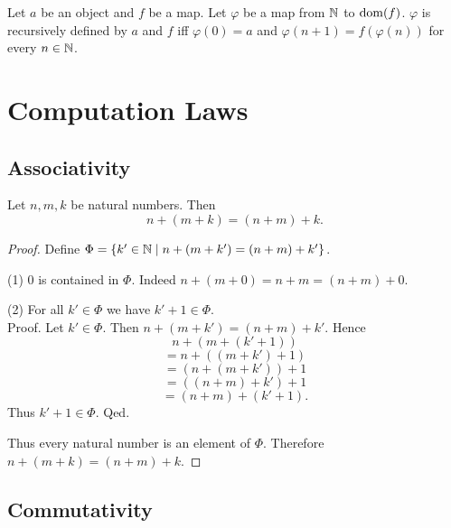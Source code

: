 \documentclass[10pt]{article}
\begin{document}
  \begin{forthel}
    \begin{proposition}
      Let $a$ be an object and $f$ be a map.
      Let $\varphi$ be a map from $\mathbb{N}$ to $\operatorname{dom}(f)$.
      $\varphi$ is recursively defined by $a$ and $f$ iff $\varphi(0) = a$ and
      $\varphi(n + 1) = f(\varphi(n))$ for every $n \in \mathbb{N}$.
    \end{proposition}
  \end{forthel}


  \section{Computation Laws}

  \subsection{Associativity}

  \begin{forthel}
    \begin{proposition}
      Let $n, m, k$ be natural numbers.
      Then \[ n + (m + k) = (n + m) + k. \]
    \end{proposition}
    \begin{proof}
      Define $\Phi = \{ k' \in \mathbb{N} \mid n + (m + k') = (n + m) + k' \}$.

      (1) $0$ is contained in $\Phi$.
      Indeed $n + (m + 0) = n + m = (n + m) + 0$.

      (2) For all $k' \in \Phi$ we have $k' + 1 \in \Phi$. \\
      Proof.
        Let $k' \in \Phi$.
        Then $n + (m + k') = (n + m) + k'$.
        Hence
        \[  n + (m + (k' + 1))        \]
        \[    = n + ((m + k') + 1)    \]
        \[    = (n + (m + k')) + 1    \]
        \[    = ((n + m) + k') + 1    \]
        \[    = (n + m) + (k' + 1).   \]
        Thus $k' + 1 \in \Phi$.
      Qed.

      Thus every natural number is an element of $\Phi$.
      Therefore $n + (m + k) = (n + m) + k$.
    \end{proof}
  \end{forthel}


  \subsection{Commutativity}
\end{document}
